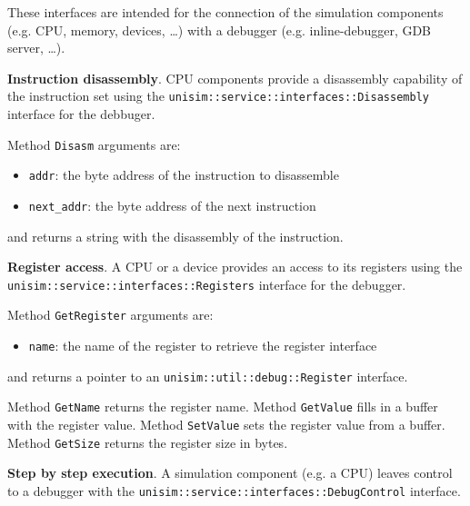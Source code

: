 These interfaces are intended for the connection of the simulation components (e.g. CPU, memory, devices, \ldots) with a debugger (e.g. inline-debugger, GDB server, \ldots).

\textbf{Instruction disassembly}. CPU components provide a disassembly capability of the instruction set using the \texttt{unisim::service::interfaces::Disassembly} interface for the debbuger.

\begin{center}
	
\end{center}

\noindent Method \texttt{Disasm} arguments are:
\begin{itemize}
\item \texttt{addr}: the byte address of the instruction to disassemble
\item \texttt{next\_addr}: the byte address of the next instruction
\end{itemize}
\noindent and returns a string with the disassembly of the instruction.

\textbf{Register access}. A CPU or a device provides an access to its registers using the \texttt{unisim::service::interfaces::Registers} interface for the debugger.

\begin{center}
	
\end{center}

\noindent Method \texttt{GetRegister} arguments are:
\begin{itemize}
\item \texttt{name}: the name of the register to retrieve the register interface
\end{itemize}
\noindent and returns a pointer to an \texttt{unisim::util::debug::Register} interface.

\begin{center}
	
\end{center}

\noindent Method \texttt{GetName} returns the register name.
\noindent Method \texttt{GetValue} fills in a buffer with the register value.
\noindent Method \texttt{SetValue} sets the register value from a buffer.
\noindent Method \texttt{GetSize} returns the register size in bytes.

\textbf{Step by step execution}. A simulation component (e.g. a CPU) leaves control to a debugger with the \texttt{unisim::service::interfaces::DebugControl} interface.

